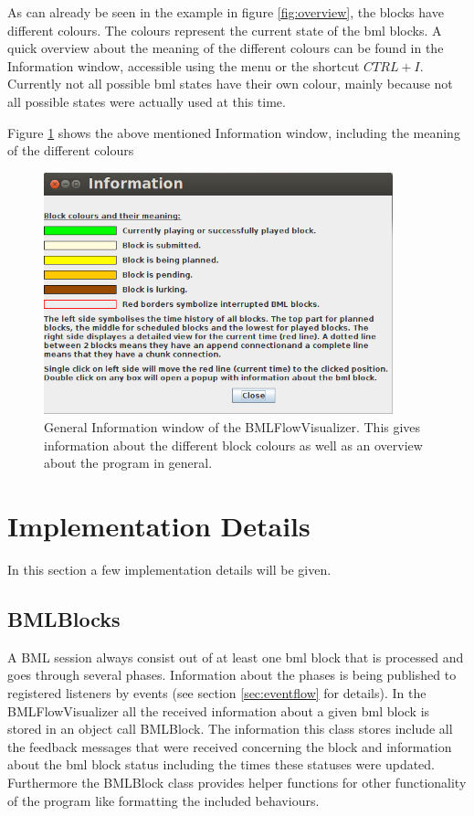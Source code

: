 \documentclass[12pt,a4paper]{article}
\begin{document}
As can already be seen in the example in figure \ref{fig:overview}, the blocks have different colours. The colours represent the current state of the bml blocks. A quick overview about the meaning of the different colours can be found in the Information window, accessible using the menu or the shortcut $CTRL+I$. Currently not all possible bml states have their own colour, mainly because not all possible states were actually used at this time.

Figure \ref{fig:help} shows the above mentioned Information window, including the meaning of the different colours

\begin{figure}[!htb]
\centering
 \includegraphics[width=0.9\textwidth]{images/bmlFlowInfo.png}
 \caption{General Information window of the BMLFlowVisualizer. This gives information about the different block colours as well as an overview about the program in general.}
 \label{fig:help}
\end{figure}


\section{Implementation Details}

In this section a few implementation details will be given.

\subsection{BMLBlocks}

A BML session always consist out of at least one bml block that is processed and goes through several phases. Information about the phases is being published to registered listeners by events (see section \ref{sec:eventflow} for details). In the BMLFlowVisualizer all the received information about a given bml block is stored in an object call BMLBlock. The information this class stores include all the feedback messages that were received concerning the block and information about the bml block status including the times these statuses were updated. Furthermore the BMLBlock class provides helper functions for other functionality of the program like formatting the included behaviours.
\end{document}
